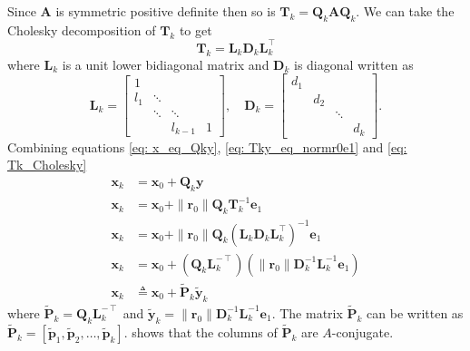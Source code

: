 Since $\bm{A}$ is symmetric positive definite then so is $\bm{T}_k  = \bm{Q}_k \bm{A} \bm{Q}_k$. We can take the Cholesky decomposition of $\bm{T}_k$ to get
\begin{equation} \label{eq: Tk_Cholesky}
    \bm{T}_k = \bm{L}_k \bm{D}_k \bm{L}_k^{\intercal}
\end{equation}
where $\bm{L}_k$ is a unit lower bidiagonal matrix and $\bm{D}_k$ is diagonal written as
\[
    \bm{L}_k =
    \begin{bmatrix}
        1   &        &         &   \\
        l_1 & \ddots &         &   \\
            & \ddots & \ddots  &   \\
            &        & l_{k-1} & 1
    \end{bmatrix}, \quad
    \bm{D}_k =
    \begin{bmatrix}
        d_1 &     &        &     \\
            & d_2 &        &     \\
            &     & \ddots &     \\
            &     &        & d_k
    \end{bmatrix}.
\]
Combining equations \ref{eq: x_eq_Qky}, \ref{eq: Tky_eq_normr0e1} and \ref{eq: Tk_Cholesky}
\begin{align*}
    \bm{x}_k & = \bm{x}_0 + \bm{Q}_k \bm{y}                                                                                                  \\
    \bm{x}_k & = \bm{x}_0 + \| \bm{r}_0 \| \bm{Q}_k \bm{T}_k^{-1} \bm{e}_1                                                                   \\
    \bm{x}_k & = \bm{x}_0 + \| \bm{r}_0 \| \bm{Q}_k \left( \bm{L}_k \bm{D}_k \bm{L}_k^{\intercal} \right)^{-1} \bm{e}_1                      \\
    \bm{x}_k & = \bm{x}_0 + \left( \bm{Q}_k \bm{L}_k^{-\intercal} \right) \left( \| \bm{r}_0 \| \bm{D}_k^{-1} \bm{L}_k^{-1} \bm{e}_1 \right) \\
    \bm{x}_k & \triangleq \bm{x}_0 + \tilde{\bm{P}}_k \tilde{\bm{y}}_k
\end{align*}
where $\tilde{\bm{P}}_k = \bm{Q}_k \bm{L}_k^{-\intercal}$ and $\tilde{\bm{y}}_k = \| \bm{r}_0 \| \bm{D}_k^{-1} \bm{L}_k^{-1} \bm{e}_1$. The matrix $\tilde{\bm{P}}_k$ can be written as
$\tilde{\bm{P}}_k = \left[ \tilde{\bm{p}}_1 , \tilde{\bm{p}}_2 , \ldots , \tilde{\bm{p}}_k \right]$.  shows that the columns of $\tilde{\bm{P}}_k$ are $A$-conjugate.

